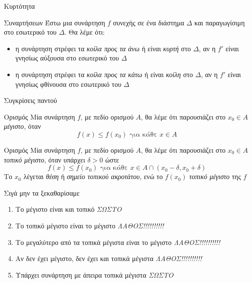 \documentclass[greek]{beamer}
\begin{document}
\begin{frame}{Κυρτότητα}
 \begin{block}{Συναρτήσεων}
  Έστω μια συνάρτηση $f$ συνεχής σε ένα διάστημα $Δ$ και παραγωγίσιμη στο εσωτερικό του $Δ$. Θα λέμε ότι:
  \begin{itemize}
   \item η συνάρτηση στρέφει τα \emph{κοίλα προς τα άνω} ή είναι \emph{κυρτή} στο $Δ$, αν η $f'$ είναι γνησίως αύξουσα στο εσωτερικό του $Δ$
   \item η συνάρτηση στρέφει τα \emph{κοίλα προς τα κάτω} ή είναι \emph{κοίλη} στο $Δ$, αν η $f'$ είναι γνησίως φθίνουσα στο εσωτερικό του $Δ$
  \end{itemize}
 \end{block}
\end{frame}

\begin{frame}{Συγκρίσεις παντού}
 \begin{block}{Ορισμός}
  Μία συνάρτηση $f$, με πεδίο ορισμού $Α$, θα λέμε ότι παρουσιάζει στο $x_0\in Α$ \emph{μέγιστο}, όταν
  $$f(x)\le f(x_0) \text{ για κάθε } x\in Α$$
 \end{block}
 \begin{block}{Ορισμός}
  Μία συνάρτηση $f$, με πεδίο ορισμού $Α$, θα λέμε ότι παρουσιάζει στο $x_0\in Α$ \emph{τοπικό μέγιστο}, όταν υπάρχει $δ>0$ ώστε
  $$f(x)\le f(x_0) \text{ για κάθε } x\in Α\cap (x_0-δ,x_0+δ)$$
  Το $x_0$ λέγεται \emph{θέση} ή \emph{σημείο τοπικού ακροτάτου}, ενώ το $f(x_0)$ \emph{τοπικό μέγιστο} της $f$
 \end{block}
\end{frame}

\begin{frame}{Σιγά μην τα ξεκαθαρίσαμε}
 \begin{enumerate}
  \item<1-> Το μέγιστο είναι και τοπικό  {\emph{ΣΩΣΤΟ}}
  \item<3-> Το τοπικό μέγιστο είναι το μέγιστο  {\emph{ΛΑΘΟΣ!!!!!!!!!!}}
  \item<5-> Το μεγαλύτερο από τα τοπικά μέγιστα είναι το μέγιστο  {\emph{ΛΑΘΟΣ!!!!!!!!!!}}
  \item<7-> Αν δεν έχει μέγιστο, δεν έχει και τοπικά μέγιστα  {\emph{ΛΑΘΟΣ!!!!!!!!!!}}
  \item<9-> Υπάρχει συνάρτηση με άπειρα τοπικά μέγιστα  {\emph{ΣΩΣΤΟ}}
 \end{enumerate}
\end{frame}
\end{document}
